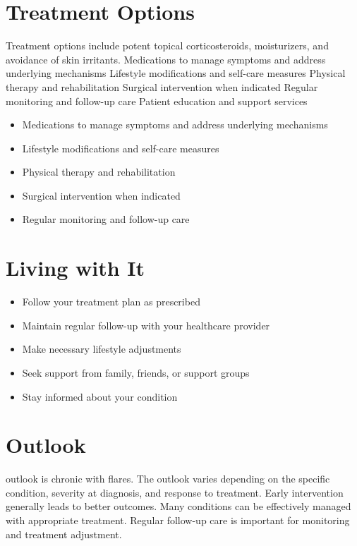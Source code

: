 \section{Treatment Options}
Treatment options include potent topical corticosteroids, moisturizers, and avoidance of skin irritants. Medications to manage symptoms and address underlying mechanisms Lifestyle modifications and self-care measures Physical therapy and rehabilitation Surgical intervention when indicated Regular monitoring and follow-up care Patient education and support services

\begin{itemize}[noitemsep]
  \item Medications to manage symptoms and address underlying mechanisms
  \item Lifestyle modifications and self-care measures
  \item Physical therapy and rehabilitation
  \item Surgical intervention when indicated
  \item Regular monitoring and follow-up care
\end{itemize}
\section{Living with It}
\begin{itemize}[noitemsep]
  \item Follow your treatment plan as prescribed
  \item Maintain regular follow-up with your healthcare provider
  \item Make necessary lifestyle adjustments
  \item Seek support from family, friends, or support groups
  \item Stay informed about your condition
\end{itemize}
\section{Outlook}
outlook is chronic with flares. The outlook varies depending on the specific condition, severity at diagnosis, and response to treatment. Early intervention generally leads to better outcomes. Many conditions can be effectively managed with appropriate treatment. Regular follow-up care is important for monitoring and treatment adjustment.
